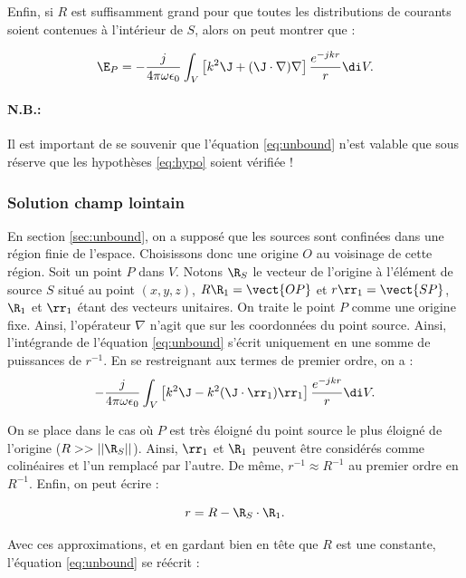 Enfin, si $R$ est suffisamment grand pour que toutes les distributions de courants soient contenues à l'intérieur de $S$, alors on peut montrer que :

\begin{equation}
	\label{eq:unbound}
	\E_P = -\frac j{4\pi\omega\epsilon_0} \int_{V}\left[k^2\J 
	+ (\J\cdot\nabla)\nabla\right]\frac{e^{-jkr}}{r}\di V.
\end{equation}

\paragraph{N.B.:} Il est important de se souvenir que l'équation \eqref{eq:unbound} n'est valable que sous réserve que les hypothèses \eqref{eq:hypo} soient vérifiée !

		\subsubsection{Solution champ lointain}
		\label{sec:champloin}
En section \ref{sec:unbound}, on a supposé que les sources sont confinées dans une région finie de l'espace. Choisissons donc une origine $O$ au voisinage de cette région. Soit un point $P$ dans $V$. Notons $\R_S$ le vecteur de l'origine à l'élément de source $S$ situé au point $(x,y,z)$, $R\R_1 = \vect{OP}$ et $r\rr_1 = \vect{SP}$, $\R_1$ et $\rr_1$ étant des vecteurs unitaires. On traite le point $P$ comme une origine fixe. Ainsi, l'opérateur $\nabla$ n'agit que sur les coordonnées du point source. Ainsi, l'intégrande de l'équation \eqref{eq:unbound} s'écrit uniquement en une somme de puissances de $r^{-1}$. En se restreignant aux termes de premier ordre, on a :
\begin{equation}
	\label{eq:firstorder}
	 -\frac j{4\pi\omega\epsilon_0} \int_{V} \left[k^2\J - k^2(\J\cdot\rr_1)\rr_1\right]
	\frac{e^{-jkr}}{r}\di V.
\end{equation}

On se place dans le cas où $P$ est très éloigné du point source le plus éloigné de l'origine ($R >> ||\R_S||$). Ainsi, $\rr_1$ et $\R_1$ peuvent être considérés comme colinéaires et l'un remplacé par l'autre. De même, $r^{-1}\approx R^{-1}$ au premier ordre en $R^{-1}$. Enfin, on peut écrire  :

\begin{equation}
	r = R-\R_S\cdot\R_1.
\end{equation}

Avec ces approximations, et en gardant bien en tête que $R$ est une constante, l'équation \eqref{eq:unbound} se réécrit :

